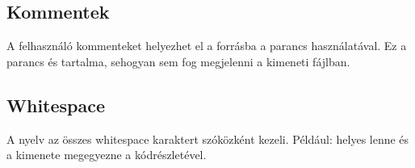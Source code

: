 \documentclass[../spec.tex]{subfiles}
\begin{document}
    \subsection{Kommentek}\label{subsec:kommentek}
    A felhasználó kommenteket helyezhet el a forrásba a \lang{\tbs \#\{[komment]\}} parancs használatával.
    Ez a parancs és tartalma, sehogyan sem fog megjelenni a kimeneti fájlban.

    \subsection{Whitespace}\label{subsec:whitespace}
    A nyelv az összes whitespace karaktert szóközként kezeli.
    Például:  helyes lenne és a kimenete megegyezne a  kódrészletével.
\end{document}

